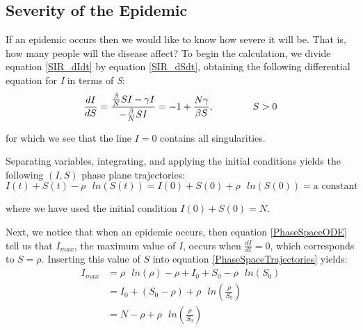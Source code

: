 \documentclass[reqno,11pt]{amsart}
\newcommand{\tab}{\hspace*{2em}}
\begin{document}
%
%
%
%
\subsection{Severity of the Epidemic}
If an epidemic occurs then we would like to know how severe it will be. That is, how many people will the disease affect? To begin the calculation, we divide equation \eqref{SIR_dIdt} by equation \eqref{SIR_dSdt}, obtaining the following differential equation for \textit{I} in terms of \textit{S}:
\begin{equation}\label{PhaseSpaceODE}
      \frac{dI}{dS}  =  \frac{\frac{\beta}{N} S I - \gamma I}{- \frac{\beta}{N}SI} = -1 + \frac{N \gamma}{\beta S},  \text{\tab \tab $S > 0$}
\end{equation}

for which we see that the line $I = 0$ contains all singularities. 

Separating variables, integrating, and applying the initial conditions yields the following $(I,S)$ phase plane trajectories:
\begin{equation}\label{PhaseSpaceTrajectories}
I(t) + S(t) - \rho \text{ } ln\left ( S(t) \right ) = I(0) + S(0) + \rho \text{ } ln \left( S(0) \right) = \text{a constant}
\end{equation}

where we have used the initial condition $I(0) + S(0) = N$.

Next, we notice that when an epidemic occurs, then equation \eqref{PhaseSpaceODE} tell us that $I_{max}$, the maximum value of $I$, occurs when $\frac{dI}{dt} = 0 $, which corresponds to $S = \rho $. Inserting this value of $S$ into equation \eqref{PhaseSpaceTrajectories} yields:
\begin{equation}\label{Eq_Imax}
\begin{split} 
I_{max} & = \rho \text{ } ln ( \rho ) - \rho + I_0 + S_0 - \rho \text{ } ln ( S_0 ) \\
      & = I_0 + ( S_0 - \rho ) + \rho \text{ } ln \left ( \frac{ \rho }{ S_0 } \right ) \\	
      & = N - \rho + \rho \text{ } ln \left ( \frac{\rho}{S_0} \right )
\end{split}
\end{equation}
\end{document}
